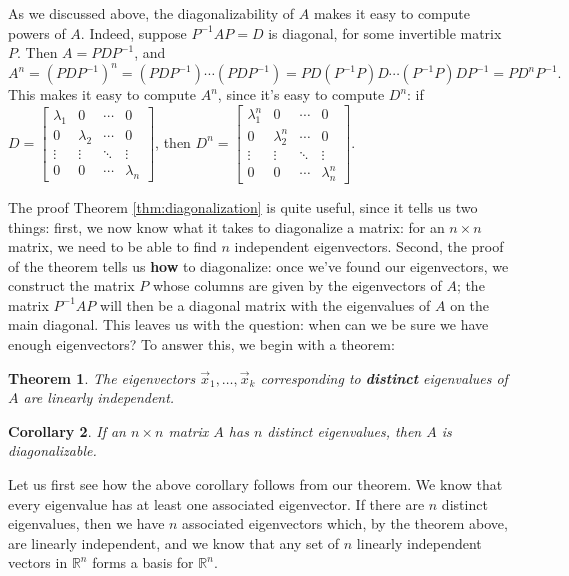 \documentclass[12pt,letterpaper]{article}
\newtheorem{theorem}{Theorem}
\newtheorem{corollary}[theorem]{Corollary}
\newcommand{\R}{\mathbb{R}}
\newcommand{\bbm}{\begin{bmatrix}}
\newcommand{\ebm}{\end{bmatrix}}
\begin{document}
As we discussed above, the diagonalizability of $A$ makes it easy to compute powers of $A$. Indeed, suppose $P^{-1}AP=D$ is diagonal, for some invertible matrix $P$. Then $A = PDP^{-1}$, and
\[
 A^n = (PDP^{-1})^n = (PDP^{-1})\cdots (PDP^{-1}) = PD(P^{-1}P)D\cdots (P^{-1}P)DP^{-1} = PD^nP^{-1}.
\]
This makes it easy to compute $A^n$, since it's easy to compute $D^n$: if $D=\bbm \lambda_1 & 0 & \cdots & 0\\0&\lambda_2 & \cdots & 0\\\vdots & \vdots & \ddots &\vdots\\0&0&\cdots & \lambda_n\ebm$, then $D^n = \bbm \lambda_1^n & 0 & \cdots & 0\\0&\lambda_2^n & \cdots & 0\\\vdots & \vdots & \ddots &\vdots\\0&0&\cdots & \lambda_n^n\ebm$.

\medskip

The proof Theorem \ref{thm:diagonalization} is quite useful, since it tells us two things: first, we now know what it takes to diagonalize a matrix: for an $n\times n$ matrix, we need to be able to find $n$ independent eigenvectors. Second, the proof of the theorem tells us \textbf{how} to diagonalize: once we've found our eigenvectors, we construct the matrix $P$ whose columns are given by the eigenvectors of $A$; the matrix $P^{-1}AP$ will then be a diagonal matrix with the eigenvalues of $A$ on the main diagonal. This leaves us with the question: when can we be sure we have enough eigenvectors? To answer this, we begin with a theorem:

\begin{theorem}
 The eigenvectors $\vec{x}_1,\ldots, \vec{x}_k$ corresponding to \textbf{distinct} eigenvalues of $A$ are linearly independent.
\end{theorem}
\begin{corollary}
 If an $n\times n$ matrix $A$ has $n$ distinct eigenvalues, then $A$ is diagonalizable.
\end{corollary}
Let us first see how the above corollary follows from our theorem. We know that every eigenvalue has at least one associated eigenvector. If there are $n$ distinct eigenvalues, then we have $n$ associated eigenvectors which, by the theorem above, are linearly independent, and we know that any set of $n$ linearly independent vectors in $\R^n$ forms a basis for $\R^n$.
\end{document}
